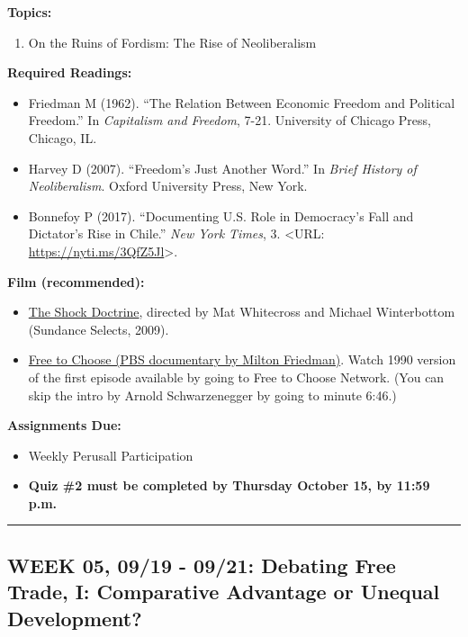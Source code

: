 \documentclass[11pt,]{article}
\providecommand{\tightlist}{%
  \setlength{\itemsep}{0pt}\setlength{\parskip}{0pt}}
\begin{document}
\textbf{Topics:}

\begin{enumerate}
\def\labelenumi{(\arabic{enumi})}
\tightlist
\item
  On the Ruins of Fordism: The Rise of Neoliberalism
\end{enumerate}

\textbf{Required Readings:}

\begin{itemize}
\item
  Friedman M (1962). ``The Relation Between Economic Freedom and
  Political Freedom.'' In \emph{Capitalism and Freedom}, 7-21.
  University of Chicago Press, Chicago, IL.
\item
  Harvey D (2007). ``Freedom's Just Another Word.'' In \emph{Brief
  History of Neoliberalism}. Oxford University Press, New York.
\item
  Bonnefoy P (2017). ``Documenting U.S. Role in Democracy's Fall and
  Dictator's Rise in Chile.'' \emph{New York Times}, 3. \textless URL:
  \url{https://nyti.ms/3QfZ5Jl}\textgreater.
\end{itemize}

\textbf{Film (recommended):}

\begin{itemize}
\item
  \href{https://www.youtube.com/watch?v=B3B5qt6gsxY}{The Shock
  Doctrine}, directed by Mat Whitecross and Michael Winterbottom
  (Sundance Selects, 2009).
\item
  \href{https://www.freetochoosenetwork.org/programs/free_to_choose/index_90.php?id=the_power_of_the_market}{Free
  to Choose (PBS documentary by Milton Friedman)}. Watch 1990 version of
  the first episode available by going to Free to Choose Network. (You
  can skip the intro by Arnold Schwarzenegger by going to minute 6:46.)
\end{itemize}

\textbf{Assignments Due:}

\begin{itemize}
\tightlist
\item
  Weekly Perusall Participation
\item
  \textbf{Quiz \#2 must be completed by Thursday October 15, by 11:59
  p.m.}
\end{itemize}

\bigbreak
\hrule

\hypertarget{week-05-0919---0921-debating-free-trade-i-comparative-advantage-or-unequal-development}{%
\subsection{WEEK 05, 09/19 - 09/21: Debating Free Trade, I: Comparative
Advantage or Unequal
Development?}\label{week-05-0919---0921-debating-free-trade-i-comparative-advantage-or-unequal-development}}
\end{document}
